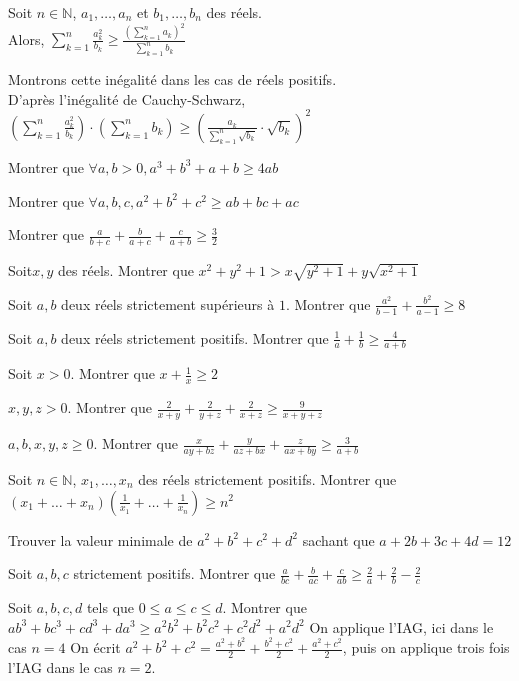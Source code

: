  Soit $n\in\mathbb{N}$, $a_1, \dots, a_n$ et $b_1, \dots, b_n$ des réels.\\ Alors, $\sum_{k=1}^n\frac{a_k^2}{b_k} \geq \frac{(\sum_{k=1}^na_k)^2}{\sum_{k=1}^n b_k}$

\preuve Montrons cette inégalité dans les cas de réels positifs. \\ D'après l'inégalité de Cauchy-Schwarz,  $(\sum_{k=1}^n\frac{a_k^2}{b_k})\cdot (\sum_{k=1}^nb_k) \geq (\frac{a_k}{\sum_{k=1}^n\sqrt{b_k}}\cdot \sqrt{b_k})^2$

\exo Montrer que $\forall a, b >0, a^3 + b^3 + a+b \geq 4ab$

\exo Montrer que $\forall a, b, c, a^2 + b^2+c^2 \geq ab+bc+ac$

Montrer que $\frac{a}{b+c} + \frac{b}{a+c} + \frac{c}{a+b} \geq \frac{3}{2} $

\exo Soit$x, y$ des réels. Montrer que $x^2+y^2+1> x\sqrt{y^2+1} + y\sqrt{x^2+1}$

\exo Soit $a, b$ deux réels strictement supérieurs à $1$. Montrer que $\frac{a^2}{b-1} + \frac {b^2}{a-1} \geq 8$

\exo Soit $a, b$ deux réels strictement positifs. Montrer que $\frac{1}{a} + \frac{1}{b} \geq \frac{4}{a+b}$

\exo Soit $x>0$. Montrer que $x+\frac{1}{x} \geq 2$

\exo $x, y, z >0$. Montrer que $\frac{2}{x+y} + \frac{2}{y+z} + \frac{2}{x+z} \geq \frac{9}{x+y+z}$

\exo $a, b, x, y, z \geq 0$. Montrer que $\frac{x}{ay+bz} + \frac{y}{az+bx} + \frac{z}{ax+by} \geq \frac{3}{a+b}$

\exo Soit $n\in \mathbb{N}$, $x_1, \dots, x_n$ des réels strictement positifs. Montrer que $(x_1+\dots+x_n)(\frac{1}{x_1}+\dots+\frac{1}{x_n}) \geq n^2$

\exo Trouver la valeur minimale de $a^2+b^2+c^2+d^2$ sachant que $a+2b+3c+4d =12$ 

\exo Soit $a, b, c$ strictement positifs. Montrer que $\frac{a}{bc}+\frac{b}{ac}+\frac{c}{ab} \geq \frac{2}{a}+\frac{2}{b}-\frac{2}{c}$

\exo Soit $a, b, c, d$ tels que $0\leq a\leq  c \leq d$. Montrer que $ab^3+bc^3+cd^3+da^3 \geq a^2b^2 + b^2c^2+c^2d^2+a^2d^2$
\sol On applique l'IAG, ici dans le cas $n=4$
\sol On écrit $a^2+b^2+c^2 = \frac{a^2+b^2}{2}+\frac{b^2+c^2}{2}+\frac{a^2+c^2}{2}$, puis on applique trois fois l'IAG dans le cas $n=2$. 

